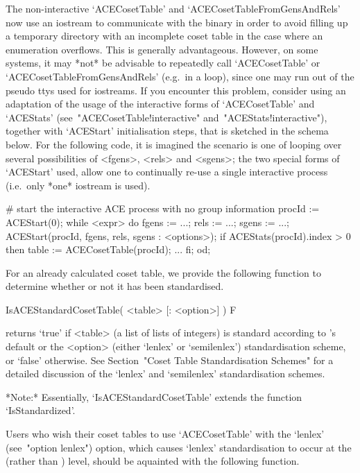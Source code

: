 The non-interactive `ACECosetTable' and `ACECosetTableFromGensAndRels'
now use an iostream to communicate with the {\ACE} binary in order  to
avoid filling up a temporary directory with an incomplete coset  table
in  the  case  where  an  enumeration  overflows.  This  is  generally
advantageous. However, on some systems, it may *not* be  advisable  to
repeatedly  call  `ACECosetTable'  or   `ACECosetTableFromGensAndRels'
(e.g.~in a loop), since one may run out of the pseudo  ttys  used  for
iostreams. If you encounter this problem, consider using an adaptation
of  the  usage  of  the  interactive  forms  of  `ACECosetTable'   and
`ACEStats'                            (see~"ACECosetTable!interactive"
and~"ACEStats!interactive"), together with  `ACEStart'  initialisation
steps, that is sketched in the schema below. For the  following  code,
it  is  imagined  the  scenario  is  one  of  looping   over   several
possibilities of <fgens>, <rels> and <sgens>; the two special forms of
`ACEStart' used, allow one to continually re-use a single  interactive
{\ACE} process (i.e.~only *one* iostream is used).

\# start the interactive ACE process with no group information
procId := ACEStart(0);
while <expr> do
fgens := ...; rels := ...; sgens := ...;
ACEStart(procId, fgens, rels, sgens : <options>);
if ACEStats(procId).index > 0 then
table := ACECosetTable(procId);
...
fi;
od;

For an already  calculated  coset  table,  we  provide  the  following
function to determine whether or not it has been standardised.

\>IsACEStandardCosetTable( <table> [: <option>] ) F

returns `true' if <table> (a list of lists of  integers)  is  standard
according to {\GAP}'s default or  the  <option>  (either  `lenlex'  or
`semilenlex')  standardisation  scheme,  or  `false'  otherwise.   See
Section~"Coset  Table  Standardisation   Schemes"   for   a   detailed
discussion of the `lenlex' and `semilenlex' standardisation schemes.

*Note:*
Essentially, `IsACEStandardCosetTable'  extends  the  {\GAP}  function
`IsStandardized'.

Users who wish their coset tables  to  use  `ACECosetTable'  with  the
`lenlex'    (see~"option     lenlex")     option,     which     causes
`lenlex' standardisation to occur at the {\ACE} (rather  than  {\GAP})
level, should be aquainted with the following function.

